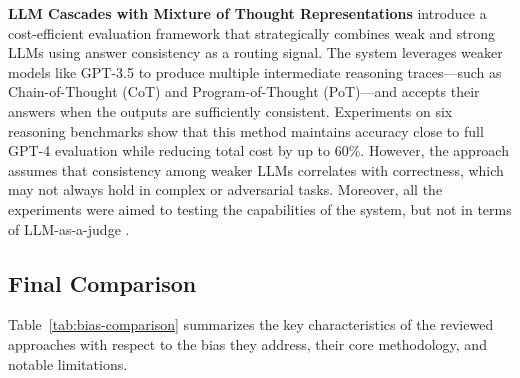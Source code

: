 \documentclass[sigconf, authoryear]{acmart}
\begin{document}
\textbf{LLM Cascades with Mixture of Thought Representations} introduce a cost-efficient evaluation framework that strategically combines weak and strong LLMs using answer consistency as a routing signal.
The system leverages weaker models like GPT-3.5 to produce multiple intermediate reasoning traces—such as Chain-of-Thought (CoT) and Program-of-Thought (PoT)—and accepts their answers when the outputs are sufficiently consistent.
Experiments on six reasoning benchmarks show that this method maintains accuracy close to full GPT-4 evaluation while reducing total cost by up to 60\%.
However, the approach assumes that consistency among weaker LLMs correlates with correctness, which may not always hold in complex or adversarial tasks.
Moreover, all the experiments were aimed to testing the capabilities of the system, but not in terms of LLM-as-a-judge \cite{yue2024largelanguagemodelcascades}.

\subsection{Final Comparison}\label{subsec:final-comparison}

Table~\ref{tab:bias-comparison} summarizes the key characteristics of the reviewed approaches with respect to the bias they address, their core methodology, and notable limitations.


\begin{table}[H]
\small
\centering
\caption{Comparison of mitigation approaches across evaluation biases}
\label{tab:bias-comparison}
\end{table}
\end{document}
